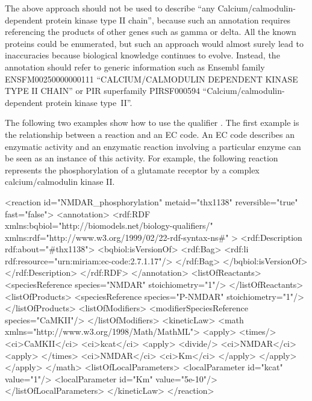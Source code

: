 The above approach should not be used to describe ``any
Calcium/calmodulin-dependent protein kinase type II chain'',
because such an annotation requires referencing the products of
other genes such as gamma or delta. All the known proteins could
be enumerated, but such an approach would almost surely lead to
inaccuracies because biological knowledge continues to evolve.
Instead, the annotation should refer to generic information such
as Ensembl family ENSFM00250000000111 ``CALCIUM/CALMODULIN DEPENDENT
KINASE TYPE II CHAIN'' or PIR superfamily PIRSF000594
``Calcium/calmodulin-dependent protein kinase type~II''.


The following two examples show how to use the qualifier
. The first example is the relationship
between a reaction and an EC code. An EC code describes an
enzymatic activity and an enzymatic reaction involving a
particular enzyme can be seen as an instance of this activity. For
example, the following reaction represents the phosphorylation of
a glutamate receptor by a complex calcium/calmodulin kinase II.

\begin{example}
<reaction id="NMDAR_phosphorylation" metaid="thx1138"
          reversible="true" fast="false">
  <annotation>
    <rdf:RDF
      xmlns:bqbiol="http://biomodels.net/biology-qualifiers/"
      xmlns:rdf="http://www.w3.org/1999/02/22-rdf-syntax-ns\#"
    >
      <rdf:Description rdf:about="#thx1138">
        <bqbiol:isVersionOf>
          <rdf:Bag>
            <rdf:li rdf:resource="urn:miriam:ec-code:2.7.1.17"/>
          </rdf:Bag>
        </bqbiol:isVersionOf>
      </rdf:Description>
    </rdf:RDF>
  </annotation>
  <listOfReactants>
    <speciesReference species="NMDAR" stoichiometry="1"/>
  </listOfReactants>
  <listOfProducts>
    <speciesReference species="P-NMDAR" stoichiometry="1"/>
  </listOfProducts>
  <listOfModifiers>
    <modifierSpeciesReference species="CaMKII"/>
  </listOfModifiers>
  <kineticLaw>
    <math xmlns="http://www.w3.org/1998/Math/MathML">
      <apply>
        <times/>
        <ci>CaMKII</ci>
        <ci>kcat</ci>
        <apply>
          <divide/>
          <ci>NMDAR</ci>
          <apply> </times> <ci>NMDAR</ci> <ci>Km</ci> </apply>
        </apply>
      </apply>
    </math>
    <listOfLocalParameters>
      <localParameter id="kcat" value="1"/>
      <localParameter id="Km" value="5e-10"/>
    </listOfLocalParameters>
  </kineticLaw>
</reaction>
\end{example}

